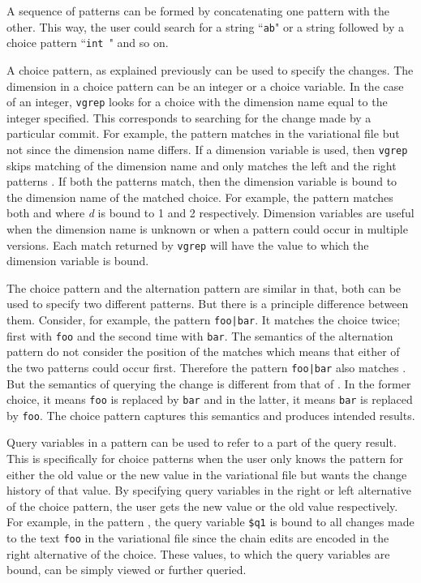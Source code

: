 A sequence of patterns can be formed by concatenating one pattern with the other. This way, the user could search for a string ``\texttt{ab}" or a string followed by a choice pattern ``\texttt{int }" and so on.

A choice pattern, as explained previously can be used to specify the changes. The dimension in a choice pattern can be an integer or a choice variable. In the case of an integer, \texttt{vgrep} looks for a choice with the dimension name equal to the integer specified. This corresponds to searching for the change made by a particular commit. For example, the pattern  matches  in the variational file but not  since the dimension name differs. If a dimension variable is used, then \texttt{vgrep} skips matching of the dimension name and only matches the left and the right patterns . If both the patterns match, then the dimension variable is bound to the dimension name of the matched choice. For example, the pattern  matches both  and  where \textit{d} is bound to 1 and 2 respectively. Dimension variables are useful when the dimension name is unknown or when a pattern could occur in multiple versions. Each match returned by \texttt{vgrep} will have the value to which the dimension variable is bound.

The choice pattern and the alternation pattern are similar in that, both can be used to specify two different patterns. But there is a principle difference between them. Consider, for example, the pattern \texttt{foo|bar}. It matches the choice  twice; first with \texttt{foo} and the second time with \texttt{bar}. The semantics of the alternation pattern do not consider the position of the matches which means that either of the two patterns could occur first. Therefore the pattern \texttt{foo|bar} also matches . But the semantics of querying the change  is different from that of . In the former choice, it means \texttt{foo} is replaced by \texttt{bar} and in the latter, it means \texttt{bar} is replaced by \texttt{foo}. The choice pattern captures this semantics and produces intended results.

Query variables in a pattern can be used to refer to a part of the query result. This is specifically for choice patterns when the user only knows the pattern for either the old value or the new value in the variational file but wants the change history of that value. By specifying query variables in the right or left alternative of the choice pattern, the user gets the new value or the old value respectively. For example, in the pattern , the query variable \texttt{\$q1} is bound to all changes made to the text \texttt{foo} in the variational file since the chain edits are encoded in the right alternative of the choice. These values, to which the query variables are bound, can be simply viewed or further queried.

